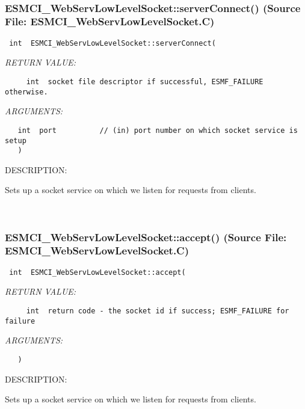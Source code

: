  
\mbox{}\hrulefill\
 
\subsubsection{ESMCI\_WebServLowLevelSocket::serverConnect() (Source File: ESMCI\_WebServLowLevelSocket.C)}


  
\begin{verbatim} int  ESMCI_WebServLowLevelSocket::serverConnect(\end{verbatim}{\em RETURN VALUE:}
\begin{verbatim}     int  socket file descriptor if successful, ESMF_FAILURE otherwise.\end{verbatim}{\em ARGUMENTS:}
\begin{verbatim}   int  port          // (in) port number on which socket service is setup
   )\end{verbatim}
{\sf DESCRIPTION:\\ }


      Sets up a socket service on which we listen for requests from clients.
   
 
\mbox{}\hrulefill\
 
\subsubsection{ESMCI\_WebServLowLevelSocket::accept() (Source File: ESMCI\_WebServLowLevelSocket.C)}


  
\begin{verbatim} int  ESMCI_WebServLowLevelSocket::accept(\end{verbatim}{\em RETURN VALUE:}
\begin{verbatim}     int  return code - the socket id if success; ESMF_FAILURE for failure\end{verbatim}{\em ARGUMENTS:}
\begin{verbatim}   )\end{verbatim}
{\sf DESCRIPTION:\\ }


      Sets up a socket service on which we listen for requests from clients.
   
 
